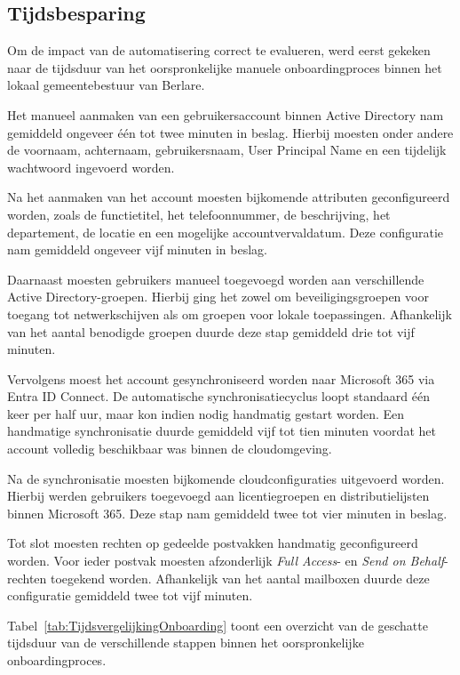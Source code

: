 \subsection{Tijdsbesparing}
Om de impact van de automatisering correct te evalueren, werd eerst gekeken naar de tijdsduur van het oorspronkelijke manuele onboardingproces binnen het lokaal gemeentebestuur van Berlare.

Het manueel aanmaken van een gebruikersaccount binnen Active Directory nam gemiddeld ongeveer één tot twee minuten in beslag. Hierbij moesten onder andere de voornaam, achternaam, gebruikersnaam, User Principal Name en een tijdelijk wachtwoord ingevoerd worden.

Na het aanmaken van het account moesten bijkomende attributen geconfigureerd worden, zoals de functietitel, het telefoonnummer, de beschrijving, het departement, de locatie en een mogelijke accountvervaldatum. Deze configuratie nam gemiddeld ongeveer vijf minuten in beslag.

Daarnaast moesten gebruikers manueel toegevoegd worden aan verschillende Active Directory-groepen. Hierbij ging het zowel om beveiligingsgroepen voor toegang tot netwerkschijven als om groepen voor lokale toepassingen. Afhankelijk van het aantal benodigde groepen duurde deze stap gemiddeld drie tot vijf minuten.

Vervolgens moest het account gesynchroniseerd worden naar Microsoft 365 via Entra ID Connect. De automatische synchronisatiecyclus loopt standaard één keer per half uur, maar kon indien nodig handmatig gestart worden. Een handmatige synchronisatie duurde gemiddeld vijf tot tien minuten voordat het account volledig beschikbaar was binnen de cloudomgeving.

Na de synchronisatie moesten bijkomende cloudconfiguraties uitgevoerd worden. Hierbij werden gebruikers toegevoegd aan licentiegroepen en distributielijsten binnen Microsoft 365. Deze stap nam gemiddeld twee tot vier minuten in beslag.

Tot slot moesten rechten op gedeelde postvakken handmatig geconfigureerd worden. Voor ieder postvak moesten afzonderlijk \textit{Full Access}- en \textit{Send on Behalf}-rech\-ten toegekend worden. Afhankelijk van het aantal mailboxen duurde deze configuratie gemiddeld twee tot vijf minuten.\newline

Tabel~\ref{tab:TijdsvergelijkingOnboarding} toont een overzicht van de geschatte tijdsduur van de verschillende stappen binnen het oorspronkelijke onboardingproces.

